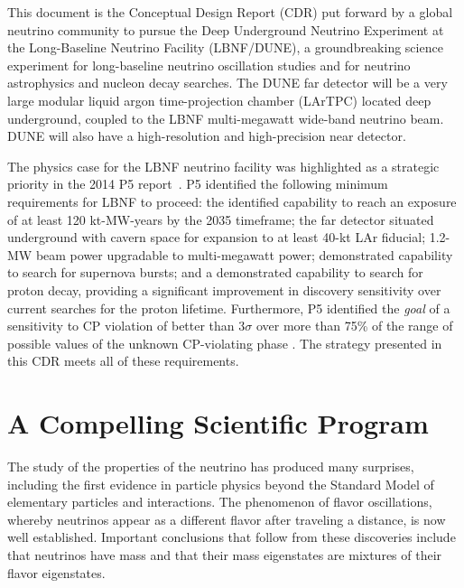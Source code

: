 This document is %
the Conceptual Design Report (CDR) put forward by a global neutrino community to pursue 
the Deep Underground Neutrino Experiment at the Long-Baseline Neutrino Facility (LBNF/DUNE),
a groundbreaking science experiment for long-baseline neutrino oscillation studies and for neutrino astrophysics and nucleon decay searches. The DUNE far detector will be a very large modular liquid argon time-projection chamber (LArTPC) located deep underground, coupled to the LBNF multi-megawatt  %
wide-band neutrino beam.   DUNE will also have a high-resolution and high-precision near detector.

The physics case for the LBNF neutrino facility was highlighted as a strategic priority in the 2014 P5 report~\cite{p5report2014}.
P5 identified the following minimum requirements for LBNF to proceed: 
the identified capability to reach an exposure of at least 120 kt-MW-years by the 2035 timeframe;
the far detector situated underground with cavern space for expansion to at least 40-kt LAr fiducial;
1.2-MW beam power upgradable to multi-megawatt power;
demonstrated capability to search for supernova bursts; and
a demonstrated capability to search for proton decay, 
providing a significant improvement in discovery sensitivity over current searches for the proton lifetime.
Furthermore, P5 identified  the \textit{goal} of a sensitivity to CP violation of better than 3$\sigma$ over more than 75\% 
of the range of possible values of the unknown CP-violating phase \deltacp.
The strategy presented in this CDR meets all of these requirements.



\section{A Compelling Scientific Program}

The study of the properties of the neutrino has produced %
many surprises, including the first evidence in particle physics beyond the Standard Model of elementary particles and interactions.   The phenomenon of flavor oscillations, whereby neutrinos 
appear as a different flavor after traveling a distance, %
is now well established. Important conclusions that follow from these discoveries include that neutrinos have mass and that their %
mass eigenstates are mixtures of their %
flavor eigenstates.

